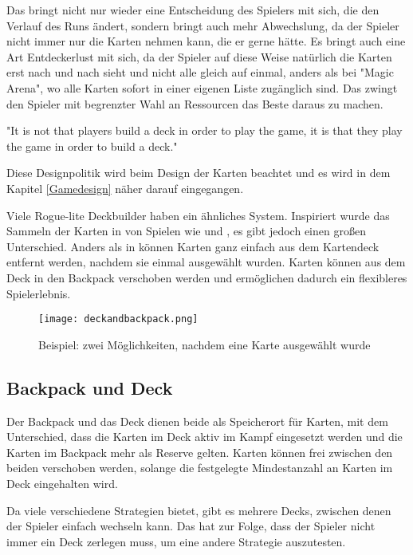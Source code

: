 Das bringt nicht nur wieder eine Entscheidung des Spielers mit sich, die den Verlauf des Runs ändert, sondern bringt auch mehr Abwechslung,
da der Spieler nicht immer nur die Karten nehmen kann, die er gerne hätte. Es bringt auch eine Art Entdeckerlust mit sich, da der Spieler
auf diese Weise natürlich die Karten erst nach und nach sieht und nicht alle gleich auf einmal, anders als bei \zB "Magic Arena",
wo alle Karten sofort in einer eigenen Liste zugänglich sind.  Das zwingt den Spieler mit begrenzter Wahl an Ressourcen das Beste daraus zu machen.

"It is not that players build a deck in order to play the game, it is that they play the game in order to build a deck."%


Diese Designpolitik wird beim Design der Karten beachtet und es wird in dem Kapitel \ref{Gamedesign} näher darauf eingegangen.


Viele Rogue-lite Deckbuilder haben ein ähnliches System. Inspiriert wurde das Sammeln der Karten in \FF von Spielen wie  und ,
es gibt jedoch einen großen Unterschied. Anders als in \zB {} können Karten ganz einfach aus dem Kartendeck entfernt werden, nachdem sie einmal ausgewählt wurden.
Karten können aus dem Deck in den Backpack verschoben werden und ermöglichen dadurch ein flexibleres Spielerlebnis.


\begin{figure}[H]
    \texttt{[image: deckandbackpack.png]}
    \caption{Beispiel: zwei Möglichkeiten, nachdem eine Karte ausgewählt wurde}
\end{figure}%

\subsection{Backpack und Deck}\label{backpack_and_deck}

Der Backpack und das Deck dienen beide als Speicherort für Karten, mit dem Unterschied, dass die Karten im Deck aktiv im
Kampf eingesetzt werden und die Karten im Backpack mehr als Reserve gelten.
Karten können frei zwischen den beiden verschoben werden, solange die festgelegte Mindestanzahl an Karten im Deck eingehalten wird.


Da \FF viele verschiedene Strategien bietet, gibt es mehrere Decks, zwischen denen der Spieler einfach wechseln kann.
Das hat zur Folge, dass der Spieler nicht immer ein Deck zerlegen muss, um eine andere Strategie auszutesten.

